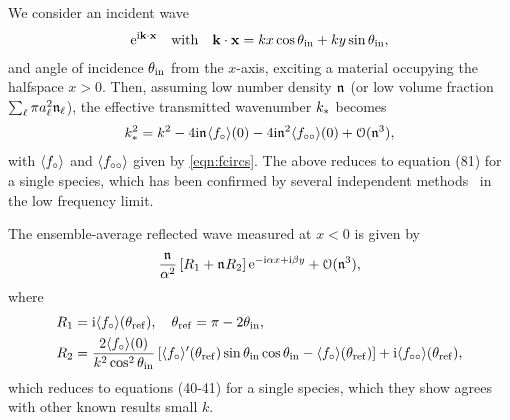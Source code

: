 \documentclass[12pt, a4paper]{article}
\begin{document}
We consider an incident wave
\begin{gather}
  \textrm{e}^{\textrm{i} \mathbf k \cdot \mathbf x} \quad \text{with} \quad \mathbf k \cdot \mathbf x = k x \cos \theta_{\mathrm{in}}  + k y \sin \theta_{\mathrm{in}},
  \label{eqns:incident}
\end{gather}
and angle of incidence $\theta_{\mathrm{in}}$ from the $x$-axis, exciting a material occupying the halfspace $x>0$. Then, assuming low number density $\mathfrak n_{}$ (or low volume fraction $\sum_\ell \pi a_\ell^2 \mathfrak n_{\ell}$), the effective transmitted wavenumber $k_*$ becomes
\begin{align}
   k_*^2 = k^2 - 4 \textrm{i} \mathfrak n_{} \langle f_\circ \rangle(0) -  4 \textrm{i} \mathfrak n_{}^2 \langle f_{\circ\circ} \rangle(0)
   + \mathcal O(\mathfrak n_{}^3),
  \label{eqn:SmallNfracDiscrete}
\end{align}
with $\langle f_\circ \rangle$ and $\langle f_{\circ\circ} \rangle$ given by \eqref{eqn:fcircs}. The above reduces to \cite{linton_multiple_2005} equation (81) for a single species, which has been confirmed by several independent methods~\cite{martin_estimating_2010,martin_multiple_2008,chekroun_time-domain_2012,kim_models_2010} in the low frequency limit.

The ensemble-average reflected wave measured at $x <0$ is given by
\begin{equation}
  \frac{\mathfrak n_{}}{\alpha^2}\left [
    R_1 + \mathfrak n_{} R_2
  \right]\textrm{e}^{-\textrm{i} \alpha x + \textrm{i} \beta y} + \mathcal O (\mathfrak n_{}^3),
  \label{eqn:reflection_results}
\end{equation}
where
\begin{align}
  &R_1 = \textrm{i} \langle f_\circ \rangle(\theta_{\mathrm{ref}}), \quad \theta_{\mathrm{ref}} = \pi - 2 \theta_{\mathrm{in}},
  \\
  &R_2 = \frac{2 \langle f_\circ \rangle(0)}{k^2 \cos^2 \theta_{\mathrm{in}}}\left [\langle f_\circ \rangle'(\theta_{\mathrm{ref}}) \sin \theta_{\mathrm{in}} \cos \theta_{\mathrm{in}} - \langle f_\circ \rangle(\theta_{\mathrm{ref}}) \right] + \textrm{i} \langle f_{\circ\circ} \rangle(\theta_{\mathrm{ref}}),
\end{align}
which reduces to \cite{martin_multiple_2011} equations (40-41) for a single species, which they show agrees with other known results small $k$.
\end{document}
